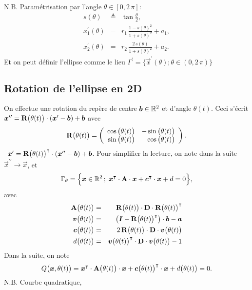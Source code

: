 \documentclass[10pt,a4paper]{article}
\begin{document}
N.B. Paramétrisation par l'angle $\theta\in [0, 2\,\pi]$:
%
\begin{equation}
\begin{array}{rcl}
s(\theta) &\triangleq& \tan\frac{\theta}{2}, \\
x_1^\prime(\theta)& =& r_1\,\frac{1-s(\theta)^2}{1+s(\theta)^2}+a_1,\\
x_2^\prime(\theta) &=& r_2\,\frac{2\,s(\theta)}{1+s(\theta)^2}+a_2.
\end{array}
\end{equation}
%
%
Et on peut définir l'ellipse comme le lieu $\Gamma^\prime = \big\{\vec x^\prime(\theta); \theta\in(0, 2\,\pi)\big\}$
%
\subsection{Rotation de l'ellipse en 2D}
%
On effectue une rotation du repère de centre $\boldsymbol{b} \in \mathbb{R}^2$ et d'angle $\theta(t)$.
%
Ceci s'écrit $\boldsymbol{x}^{\prime\prime} = \mathbf{R}\big(\theta(t)\big)\cdot (\boldsymbol{x} ^\prime-\boldsymbol{b}) + \boldsymbol{b}$ avec 
%
$$\mathbf{R}\big(\theta(t)\big) = \left( 
\begin{array}{rr}
\cos \big(\theta(t)\big)& - \sin \big(\theta(t)\big) \\
\sin \big(\theta(t)\big)& \cos \big(\theta(t)\big)
\end{array}
\right).$$
%
\ie~$\boldsymbol{x} ^\prime = \mathbf{R}\big(\theta(t)\big)^\intercal\cdot(\boldsymbol{x}^{\prime\prime}-\boldsymbol{b})+\boldsymbol{b}$.
%
Pour simplifier la lecture, on note dans la suite $\vec{x}^{\prime\prime}\rightarrow \vec{x}$, et 
\begin{equation}
\Gamma_\theta = \Big\{\boldsymbol{x} \in \mathbb{R}^2\,;\; \boldsymbol{x}^\intercal\cdot \mathbf{A}\cdot \boldsymbol{x} + \boldsymbol{c}^\intercal\cdot \boldsymbol{x} + d=0\Big\},
\end{equation}
avec
\begin{eqnarray}
\mathbf{A}\big(\theta(t)\big) &=& \mathbf{R}\big(\theta(t)\big)\cdot\mathbf{D}\cdot\mathbf{R}\big(\theta(t)\big)^\intercal\\
\boldsymbol{v}\big(\theta(t)\big) & = & \left(\boldsymbol{I}-\mathbf{R}\big(\theta(t)\big)^\intercal\right)\cdot\boldsymbol{b}-\boldsymbol{a}\\
\boldsymbol{c}\big(\theta(t)\big) &=& 2\, \mathbf{R}\big(\theta(t)\big)\cdot\mathbf{D}\cdot \boldsymbol{v}\big(\theta(t)\big)\\
d\big(\theta(t)\big) &=&\boldsymbol{v}\big(\theta(t)\big)^\intercal\cdot\mathbf{D}\cdot\boldsymbol{v}\big(\theta(t)\big) -1 \\
\end{eqnarray}
%
Dans la suite, on note
\begin{equation}
\label{eq:Q(x)}
Q\big(\boldsymbol{x}, \theta(t)\big) = \boldsymbol{x}^\intercal\cdot \mathbf{A}\big(\theta(t)\big)\cdot \boldsymbol{x} + \boldsymbol{c}\big(\theta(t)\big)^\intercal\cdot \boldsymbol{x} + d\big(\theta(t)\big)=0.
\end{equation}
%
N.B. Courbe quadratique, \cf~\cite[, page 181]{schneider2002geometric}
%
\end{document}
